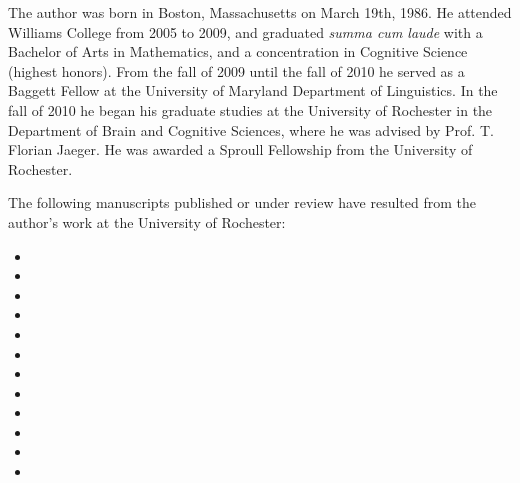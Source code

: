 \begin{curriculumvitae}
  The author was born in Boston, Massachusetts on March 19th, 1986. He attended
  Williams College from 2005 to 2009, and graduated \emph{summa cum laude} with
  a Bachelor of Arts in Mathematics, and a concentration in Cognitive Science
  (highest honors). From the fall of 2009 until the fall of 2010 he served as a
  Baggett Fellow at the University of Maryland Department of Linguistics. In the
  fall of 2010 he began his graduate studies at the University of Rochester in
  the Department of Brain and Cognitive Sciences, where he was advised by
  Prof. T. Florian Jaeger. He was awarded a Sproull Fellowship from the
  University of Rochester.

  The following manuscripts published or under review have resulted from the
  author's work at the University of Rochester:

  \begin{itemize}
  \item {}
  \item {}
  \item {}
  \item {}
  \item {}
  \item {}
  \item {}
  \item {}
  \item {}
  \item {}
  \item {}
  \item {}
  \end{itemize}

\end{curriculumvitae}

